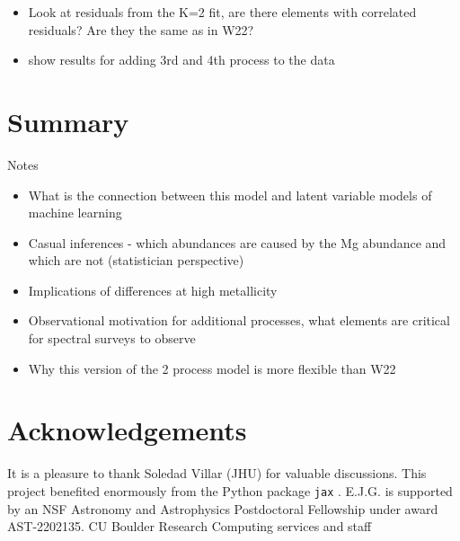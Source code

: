 \documentclass[modern]{aastex631}
\begin{document}
\begin{itemize}
    \item Look at residuals from the K=2 fit, are there elements with correlated residuals? Are they the same as in W22? 
    \item show results for adding 3rd and 4th process to the data
\end{itemize}


\section{Summary}\label{sec:summary}

Notes

\begin{itemize}
    \item What is the connection between this model and latent variable models of machine learning
    \item Casual inferences - which abundances are caused by the Mg abundance and which are not (statistician perspective)
    \item Implications of differences at high metallicity
    \item Observational motivation for additional processes, what elements are critical for spectral surveys to observe
    \item Why this version of the 2 process model is more flexible than W22
\end{itemize}

\section{Acknowledgements}
It is a pleasure to thank
  Soledad Villar (JHU)
for valuable discussions.
This project benefited enormously from the Python package \texttt{jax} \citep{jax}.
E.J.G. is supported by an NSF Astronomy and Astrophysics Postdoctoral Fellowship under award AST-2202135.
CU Boulder Research Computing services and staff


{}

\end{document}
